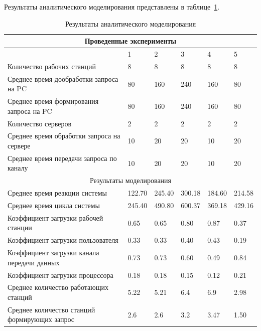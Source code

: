 \documentclass[russian,utf8,emptystyle]{eskdtext}
\begin{document}
Результаты аналитического моделирования представлены в таблице~\ref{tab:anal-result}.
\clearpage

\begin{longtable}{p{9.5cm}|p{1.15cm}|p{1.15cm}|p{1.15cm}|p{1.15cm}|p{1.15cm}}
\caption{Результаты аналитического моделирования}
\label{tab:anal-result} \\
\hline
\multicolumn{6}{c}{Проведенные эксперименты} \\ \hline
                                                    & 1      & 2      & 3      & 4      & 5       \\ \cline{2-6}
Количество рабочих станций                          & 8      & 8      & 8      & 8      & 8      \\
Среднее время дообработки запроса на PC             & 80     & 160    & 240    & 160    & 80     \\
Среднее время формирования запроса на PC            & 80     & 160    & 240    & 160    & 80     \\
Количество серверов                                 & 2      & 2      & 2      & 2      & 2      \\
Среднее время обработки запроса на сервере          & 10     & 20     & 20     & 10     & 20     \\
Среднее время передачи запроса по каналу            & 10     & 20     & 20     & 10     & 20     \\  
\hline
\multicolumn{6}{c}{Результаты моделирования} \\ 
\hline
Среднее время реакции системы                       & 122.70 & 245.40 & 300.18 & 184.60 & 214.58 \\
Среднее время цикла системы                         & 245.40 & 490.80 & 600.37 & 369.18 & 429.16 \\
Коэффициент загрузки рабочей станции                & 0.65   & 0.65   & 0.80   & 0.87   & 0.37   \\
Коэффициент загрузки пользователя                   & 0.33   & 0.33   & 0.40   & 0.43   & 0.19   \\
Коэффициент загрузки канала передачи данных         & 0.73   & 0.73   & 0.60   & 0.49   & 0.84   \\
Коэффициент загрузки процессора                     & 0.18   & 0.18   & 0.15   & 0.12   & 0.21   \\
Среднее количество работающих станций               & 5.22   & 5.21   & 6.4    & 6.9    & 2.98   \\
Среднее количество станций формирующих запрос       & 2.6    & 2.6    & 3.2    & 3.47   & 1.50   \\
\end{longtable}
\end{document}
